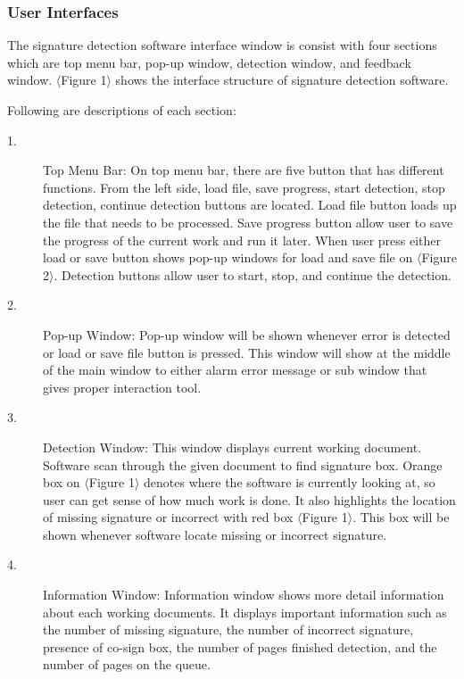 \documentclass[onecolumn, draftclsnofoot,10pt, compsoc]{IEEEtran}
\begin{document}
\subsubsection{User Interfaces}
The signature detection software interface window is consist with four sections which are top menu bar, pop-up window, detection window, and feedback window. $\langle$Figure 1$\rangle$ shows the interface structure of signature detection software.

Following are descriptions of each section:

\begin{description}
	\item[1.]Top Menu Bar:  On top menu bar, there are five button that has different functions. From the left side, load file, save progress, start detection, stop detection, continue detection buttons are located. Load file button loads up the file that needs to be processed. Save progress button allow user to save the progress of the current work and run it later. When user press either load or save button shows pop-up windows for load and save file on $\langle$Figure 2$\rangle$. Detection buttons allow user to start, stop, and continue the detection.

	\item[2.]Pop-up Window: Pop-up window will be shown whenever error is detected or load or save file button is pressed. This window will show at the middle of the main window to either alarm error message or sub window that gives proper interaction tool.

	\item[3.]Detection Window: This window displays current working document. Software scan through the given document to find signature box. Orange box on $\langle$Figure 1$\rangle$ denotes where the software is currently looking at, so user can get sense of how much work is done. It also highlights the location of missing signature or incorrect with red box $\langle$Figure 1$\rangle$. This box will be shown whenever software locate missing or incorrect signature.

	\item[4.]Information Window: Information window shows more detail information about each working documents. It displays important information such as the number of missing signature, the number of incorrect signature, presence of co-sign box, the number of pages finished detection, and the number of pages on the queue.

\end{description}
\end{document}
